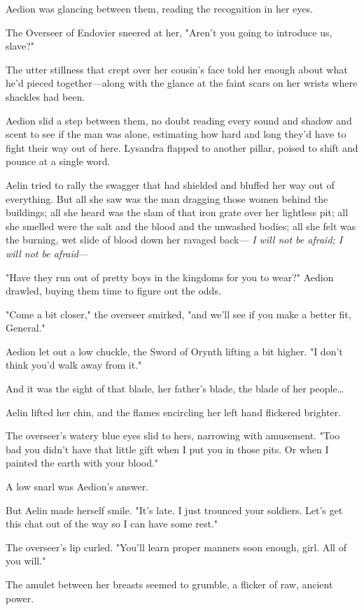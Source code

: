 Aedion was glancing between them, reading the recognition in her eyes.

The Overseer of Endovier sneered at her, "Aren't you going to introduce us, slave?"

The utter stillness that crept over her cousin's face told her enough about what he'd pieced together---along with the glance at the faint scars on her wrists where shackles had been.

Aedion slid a step between them, no doubt reading every sound and shadow and scent to see if the man was alone, estimating how hard and long they'd have to fight their way out of here. Lysandra flapped to another pillar, poised to shift and pounce at a single word.

Aelin tried to rally the swagger that had shielded and bluffed her way out of everything. But all she saw was the man dragging those women behind the buildings; all she heard was the slam of that iron grate over her lightless pit; all she smelled were the salt and the blood and the unwashed bodies; all she felt was the burning, wet slide of blood down her ravaged back--- \emph{I will not be afraid; I will not be afraid}---

"Have they run out of pretty boys in the kingdoms for you to wear?" Aedion drawled, buying them time to figure out the odds.

"Come a bit closer," the overseer smirked, "and we'll see if you make a better fit, General."

Aedion let out a low chuckle, the Sword of Orynth lifting a bit higher. "I don't think you'd walk away from it."

And it was the sight of that blade, her father's blade, the blade of her people\ldots{}

Aelin lifted her chin, and the flames encircling her left hand flickered brighter.

The overseer's watery blue eyes slid to hers, narrowing with amusement. "Too bad you didn't have that little gift when I put you in those pits. Or when I painted the earth with your blood."

A low snarl was Aedion's answer.

But Aelin made herself smile. "It's late. I just trounced your soldiers. Let's get this chat out of the way so I can have some rest."

The overseer's lip curled. "You'll learn proper manners soon enough, girl. All of you will."

The amulet between her breasts seemed to grumble, a flicker of raw, ancient power.

